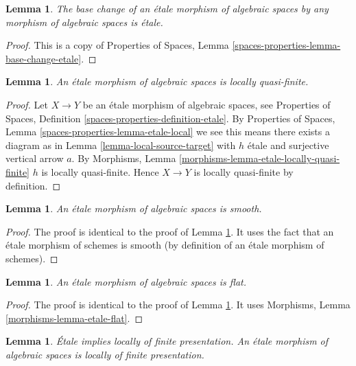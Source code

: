 \documentclass{stacks-project}
\newenvironment{slogan}{\comment}{\endcomment}
\theoremstyle{plain}
\newtheorem{lemma}[subsection]{Lemma}
\theoremstyle{definition}
\theoremstyle{remark}
\numberwithin{equation}{subsection}
\begin{document}
\begin{lemma}
\label{lemma-base-change-etale}
The base change of an \'etale morphism of algebraic spaces
by any morphism of algebraic spaces is \'etale.
\end{lemma}

\begin{proof}
This is a copy of
Properties of Spaces, Lemma \ref{spaces-properties-lemma-base-change-etale}.
\end{proof}

\begin{lemma}
\label{lemma-etale-locally-quasi-finite}
An \'etale morphism of algebraic spaces is locally quasi-finite.
\end{lemma}

\begin{proof}
Let $X \to Y$ be an \'etale morphism of algebraic spaces, see
Properties of Spaces, Definition \ref{spaces-properties-definition-etale}.
By
Properties of Spaces, Lemma \ref{spaces-properties-lemma-etale-local}
we see this means there exists a diagram as in
Lemma \ref{lemma-local-source-target}
with $h$ \'etale and surjective vertical arrow $a$. By
Morphisms, Lemma \ref{morphisms-lemma-etale-locally-quasi-finite}
$h$ is locally quasi-finite. Hence $X \to Y$ is locally quasi-finite
by definition.
\end{proof}

\begin{lemma}
\label{lemma-etale-smooth}
An \'etale morphism of algebraic spaces is smooth.
\end{lemma}

\begin{proof}
The proof is identical to the proof of
Lemma \ref{lemma-etale-locally-quasi-finite}.
It uses the fact that an \'etale morphism of schemes is smooth
(by definition of an \'etale morphism of schemes).
\end{proof}

\begin{lemma}
\label{lemma-etale-flat}
An \'etale morphism of algebraic spaces is flat.
\end{lemma}

\begin{proof}
The proof is identical to the proof of
Lemma \ref{lemma-etale-locally-quasi-finite}.
It uses
Morphisms, Lemma \ref{morphisms-lemma-etale-flat}.
\end{proof}

\begin{lemma}
\label{lemma-etale-locally-finite-presentation}
\begin{slogan}
\'Etale implies locally of finite presentation.
\end{slogan}
An \'etale morphism of algebraic spaces is locally of finite presentation.
\end{lemma}
\end{document}
